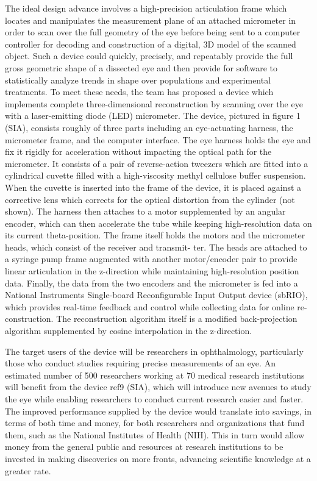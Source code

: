 \documentclass{article}
\begin{document}
The ideal design advance involves a high-precision articulation frame which locates and manipulates the
measurement plane of an attached micrometer in order to scan over the full geometry of the eye before being
sent to a computer controller for decoding and construction of a digital, 3D model of the scanned object.
Such a device could quickly, precisely, and repeatably provide the full gross geometric shape of a dissected
eye and then provide for software to statistically analyze trends in shape over populations and experimental
treatments.
To meet these needs, the team has proposed a device which implements complete three-dimensional
reconstruction by scanning over the eye with a laser-emitting diode (LED) micrometer. The device, pictured
in figure 1 (SIA), consists roughly of three parts including an eye-actuating harness, the micrometer frame, and
the computer interface. The eye harness holds the eye and fix it rigidly for acceleration without impacting the
optical path for the micrometer. It consists of a pair of reverse-action tweezers which are fitted into
a cylindrical cuvette filled with a high-viscosity methyl cellulose buffer suspension. When the cuvette is 
inserted into the frame of the device, it is placed against a corrective lens which corrects for the optical 
distortion from the cylinder (not shown). The harness then attaches to a
motor supplemented by an angular encoder, which can then accelerate the tube while keeping high-resolution
data on its current theta-position.
The frame itself holds the motors and the micrometer heads, which consist of the receiver and transmit-
ter. The heads are attached to a syringe pump frame augmented with another motor/encoder pair to provide
linear articulation in the z-direction while maintaining high-resolution position data. Finally, the data from
the two encoders and the micrometer is fed into a National Instruments Single-board Reconfigurable Input
Output device (sbRIO), which provides real-time feedback and control while collecting data for online re-
construction. The reconstruction algorithm itself is a modified back-projection algorithm supplemented by
cosine interpolation in the z-direction.


The target users of the device will be researchers in ophthalmology, particularly those who conduct studies
requiring precise measurements of an eye. An estimated number of 500 researchers working at 70 medical
research institutions will benefit from the device \cite{Nickerson}ref9 (SIA), which will introduce new avenues to study the eye while
enabling researchers to conduct current research easier and faster. The improved performance supplied by the
device would translate into savings, in terms of both time and money, for both researchers and organizations
that fund them, such as the National Institutes of Health (NIH). This in turn would allow money from the
general public and resources at research institutions to be invested in making discoveries on more fronts,
advancing scientific knowledge at a greater rate.
\end{document}
